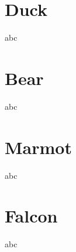 \documentclass{beamer}
\begin{document}
\section{Duck}
\begin{frame}
    abc
\end{frame} 

\section{Bear}
\begin{frame}
    abc
\end{frame} 

\section{Marmot}
\begin{frame}
    abc
\end{frame} 

\section{Falcon}
\begin{frame}
    abc
\end{frame} 
\end{document}

